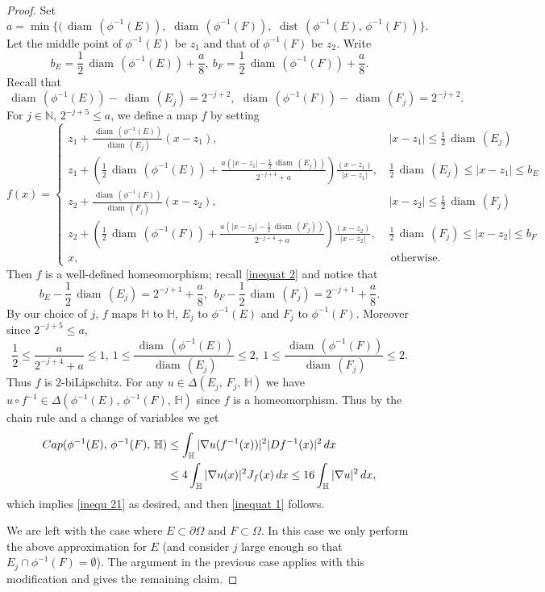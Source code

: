 \documentclass[10pt,a4paper]{amsart}
\def\diam{{\mathop\mathrm{\,diam\,}}}
\def\dist{{\mathop\mathrm{\,dist\,}}}
\begin{document}
\begin{proof}
 Set 
$$a=\min\{(\diam(\phi^{-1}(E)),\,\diam(\phi^{-1}(F)),\,\dist(\phi^{-1}(E),\,\phi^{-1}(F))\}.$$ 
Let the middle point of $\phi^{-1}(E)$ be $z_1$ and that of $\phi^{-1}(F)$ be $z_2$. 
Write 
\begin{equation}\label{inequat 2}
b_E=\frac 1 2 \diam(\phi^{-1}(E)) +\frac a 8,\ b_F=\frac 1 2 \diam(\phi^{-1}(F)) +\frac a 8.
\end{equation}
Recall that
$$\diam(\phi^{-1}(E))-\diam(E_j) = 2^{-j+2},\ \diam(\phi^{-1}(F))-\diam(F_j) = 2^{-j+2}. $$
For $j\in \mathbb N,\, 2^{-j+5}\le a$, we define a map $f$ by setting
$$ f(x)=
 \begin{cases}
   z_1+\frac{\diam(\phi^{-1}(E))}{\diam(E_j)}(x-z_1), & \,  |x-z_1|\le \frac 1 2 \diam(E_j) \\
  z_1+\left(\frac 1 2 \diam(\phi^{-1}(E)) + \frac{ a \left(|x-z_1|-\frac 1 2 \diam(E_j)\right)}{ 2^{-j+4}+ a}  \right)\frac {(x-z_1)}{|x-z_1|}, &   \, \frac 1 2 \diam(E_j)\le |x-z_1|\le b_E \\
   z_2+\frac{\diam(\phi^{-1}(F))}{\diam(F_j)}(x-z_2), & \,  |x-z_2|\le \frac 1 2 \diam(F_j) \\
   z_2+\left(\frac 1 2 \diam(\phi^{-1}(F)) + \frac{ a \left(|x-z_2|-\frac 1 2 \diam(F_j)\right) }{ 2^{-j+4}+ a}\right) \frac {(x-z_2)}{|x-z_2|}, &   \, \frac 1 2 \diam(F_j)\le |x-z_2|\le b_F \\
    x , & \text{ otherwise.}
 \end{cases}$$
 Then $f$ is a well-defined homeomorphism; recall \eqref{inequat 2} and notice that
 $$b_E-\frac 1 2 \diam(E_j)= 2^{-j+1}+\frac a 8, \ \ b_F-\frac 1 2 \diam(F_j)= 2^{-j+1}+\frac a 8.$$
By our choice of $j$, $f$  maps $\mathbb H$ to $\mathbb H$, $E_j$ to $\phi^{-1}(E)$ and $F_j$ to $\phi^{-1}(F)$. Moreover since $2^{-j+5}\le a$, 
$$ \frac 1 2 \le \frac { a }{ 2^{-j+4}+a}\le 1 ,\ 1\le \frac{\diam(\phi^{-1}(E))}{\diam(E_j)}\le 2,\  1\le \frac{\diam(\phi^{-1}(F))}{\diam(F_j)} \le 2.$$
Thus $f$ is $2$-biLipschitz. For any $u\in \Delta(E_j ,\, F_j,\,\mathbb H)$ we have $u\circ f^{-1}\in \Delta( \phi^{-1}(E) ,\,  \phi^{-1}(F),\,\mathbb H)$ since $f$ is a homeomorphism. Thus by the chain rule and  a change of variables we get
\begin{align*}
{\rm Cap}(\phi^{-1}(E) ,\, \phi^{-1}(F) ,\,  \mathbb H)& \le  \int_{\mathbb H} |\nabla u(f^{-1}(x))|^2 |Df^{-1}(x)|^2 \, dx\\
&\le 4 \int_{\mathbb H} |\nabla u(x)|^2  J_{f}(x) \, dx \le 16 \int_{\mathbb H} |\nabla u|^2 \, dx,
\end{align*}
which implies \eqref{inequ 21} as desired, and then \eqref{inequat 1} follows. 

 We are left with the case  where $E\subset \partial\Omega$ and $F\subset\Omega$. In this case we  only perform the above approximation for $E$ (and consider $j$ large enough so that $E_j\cap \phi^{-1}(F)=\emptyset$). The argument in the previous case applies with this modification and gives the remaining claim. 
\end{proof}
\end{document}

